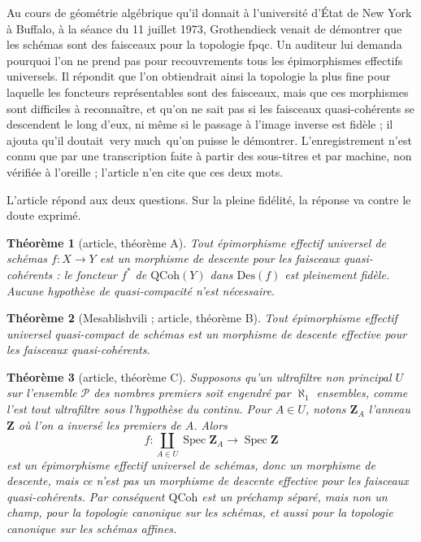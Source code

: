 \documentclass[11pt,a4paper]{amsart}
\theoremstyle{definition}
\theoremstyle{plain}
\newtheorem{theoreme}{Théorème}
\theoremstyle{remark}
\newcommand{\Z}{\mathbf Z}
\newcommand{\Pp}{\mathcal P}
\newcommand{\QCoh}{\mathrm{QCoh}}
\newcommand{\Des}{\mathrm{Des}}
\newcommand{\Spec}{\operatorname{Spec}}
\begin{document}
Au cours de géométrie algébrique qu'il donnait à l'université d'État de New York à Buffalo, à la séance du 11 juillet 1973, Grothendieck venait de démontrer que les schémas sont des faisceaux pour la topologie fpqc. Un auditeur lui demanda pourquoi l'on ne prend pas pour recouvrements tous les épimorphismes effectifs universels. Il répondit que l'on obtiendrait ainsi la topologie la plus fine pour laquelle les foncteurs représentables sont des faisceaux, mais que ces morphismes sont difficiles à reconnaître, et qu'on ne sait pas si les faisceaux quasi-cohérents se descendent le long d'eux, ni même si le passage à l'image inverse est fidèle ; il ajouta qu'il doutait \guillemotleft\,very much\,\guillemotright{} qu'on puisse le démontrer. L'enregistrement n'est connu que par une transcription faite à partir des sous-titres et par machine, non vérifiée à l'oreille ; l'article n'en cite que ces deux mots.

L'article répond aux deux questions. Sur la pleine fidélité, la réponse va contre le doute exprimé.

\begin{theoreme}[article, théorème A]
Tout épimorphisme effectif universel de schémas $f\colon X\to Y$ est un morphisme de descente pour les faisceaux quasi-cohérents : le foncteur $f^*$ de $\QCoh(Y)$ dans $\Des(f)$ est pleinement fidèle. Aucune hypothèse de quasi-compacité n'est nécessaire.
\end{theoreme}

\begin{theoreme}[Mesablishvili ; article, théorème B]
Tout épimorphisme effectif universel quasi-compact de schémas est un morphisme de descente effective pour les faisceaux quasi-cohérents.
\end{theoreme}

\begin{theoreme}[article, théorème C]
Supposons qu'un ultrafiltre non principal $U$ sur l'ensemble $\Pp$ des nombres premiers soit engendré par $\aleph_1$ ensembles, comme l'est tout ultrafiltre sous l'hypothèse du continu. Pour $A\in U$, notons $\Z_A$ l'anneau $\Z$ où l'on a inversé les premiers de $A$. Alors \[f\colon\coprod_{A\in U}\Spec\Z_A\to\Spec\Z\] est un épimorphisme effectif universel de schémas, donc un morphisme de descente, mais ce n'est pas un morphisme de descente effective pour les faisceaux quasi-cohérents. Par conséquent $\QCoh$ est un préchamp séparé, mais non un champ, pour la topologie canonique sur les schémas, et aussi pour la topologie canonique sur les schémas affines.
\end{theoreme}
\end{document}
